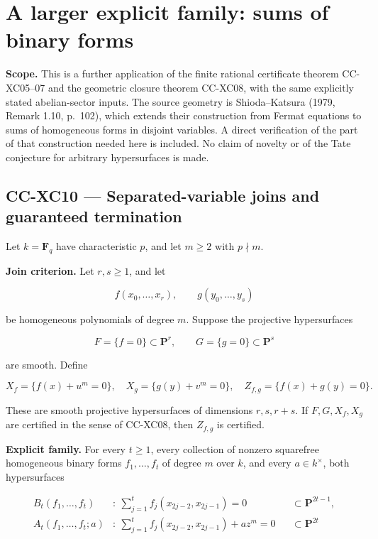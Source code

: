 \section{A larger explicit family: sums of binary
forms}\label{a-larger-explicit-family-sums-of-binary-forms}

\textbf{Scope.} This is a further application of the finite rational
certificate theorem CC-XC05--07 and the geometric closure theorem
CC-XC08, with the same explicitly stated abelian-sector inputs. The
source geometry is Shioda--Katsura (1979, Remark 1.10, p.~102), which
extends their construction from Fermat equations to sums of homogeneous
forms in disjoint variables. A direct verification of the part of that
construction needed here is included. No claim of novelty or of the Tate
conjecture for arbitrary hypersurfaces is made.

\subsection{CC-XC10 --- Separated-variable joins and guaranteed
termination}\label{cc-xc10-separated-variable-joins-and-guaranteed-termination}

Let \(k=\mathbf F_q\) have characteristic \(p\), and let \(m\ge2\) with
\(p\nmid m\).

\textbf{Join criterion.} Let \(r,s\ge1\), and let

\[
 f(x_0,\ldots,x_r),\qquad g(y_0,\ldots,y_s)
\]

be homogeneous polynomials of degree \(m\). Suppose the projective
hypersurfaces

\[
 F=\{f=0\}\subset\mathbf P^r,\qquad
 G=\{g=0\}\subset\mathbf P^s
\]

are smooth. Define

\[
 X_f=\{f(x)+u^m=0\},\quad
 X_g=\{g(y)+v^m=0\},\quad
 Z_{f,g}=\{f(x)+g(y)=0\}.
 \tag{CC-XC.S24}
\]

These are smooth projective hypersurfaces of dimensions \(r,s,r+s\). If
\(F,G,X_f,X_g\) are certified in the sense of CC-XC08, then \(Z_{f,g}\)
is certified.

\textbf{Explicit family.} For every \(t\ge1\), every collection of
nonzero squarefree homogeneous binary forms \(f_1,\ldots,f_t\) of degree
\(m\) over \(k\), and every \(a\in k^\times\), both hypersurfaces

\[
 \begin{aligned}
 B_t(f_1,\ldots,f_t)
   &:\ \sum_{j=1}^t f_j(x_{2j-2},x_{2j-1})=0
       &&\subset\mathbf P^{2t-1},\\
 A_t(f_1,\ldots,f_t;a)
   &:\ \sum_{j=1}^t f_j(x_{2j-2},x_{2j-1})+a z^m=0
       &&\subset\mathbf P^{2t}
 \end{aligned}
 \tag{CC-XC.S25}
\]

